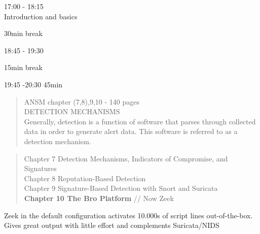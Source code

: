 \documentclass[Screen16to9,17pt]{foils}
\begin{document}

\begin{list2}
\item 17:00 - 18:15\\
Introduction and basics
\item 30min break\\

\item 18:45 - 19:30\\

\item 15min break\\

\item 19:45 -20:30 45min\\
\end{list2}



\begin{quote}
ANSM chapter (7,8),9,10 - 140 pages\\
DETECTION MECHANISMS\\
Generally, detection is a function of software that parses through collected data in order to generate alert data. This software is referred to as a detection mechanism.
\end{quote}

\begin{quote}
Chapter 7 Detection Mechanisms, Indicators of Compromise, and Signatures\\
Chapter 8 Reputation-Based Detection\\
Chapter 9 Signature-Based Detection with Snort and Suricata\\{\bf
Chapter 10 The Bro Platform} // Now Zeek
\end{quote}

Zeek in the default configuration activates 10.000s of script lines out-of-the-box.\\
Gives great output with little effort and complements Suricata/NIDS




\end{document}
